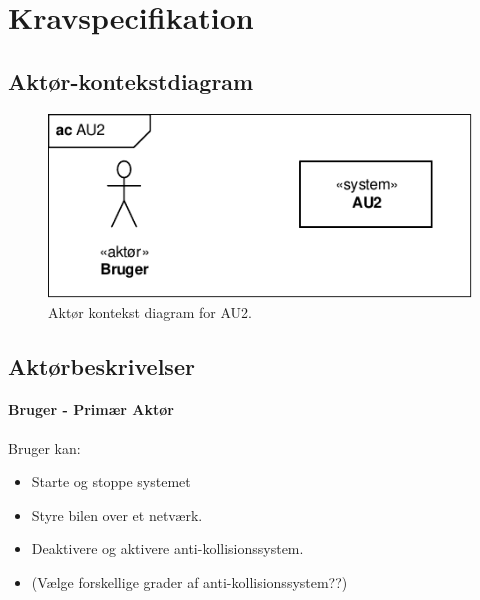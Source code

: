 \chapter{Kravspecifikation} \label{ch:kravspecifikation}


\section{Aktør-kontekstdiagram} \label{sec:aktor-kontekstdiagram}

\begin{figure}[h]
\centering
\includegraphics[width=\textwidth - 3 cm]{../fig/diagrammer/ac_au2.pdf}
\caption{Aktør kontekst diagram for AU2.}
\label{fig:aktor_kontekst}
\end{figure}


\section{Aktørbeskrivelser} \label{sec:aktorbeskrivelser}
\subsubsection{Bruger - Primær Aktør}
Bruger kan:
\begin{itemize}
\item Starte og stoppe systemet 
\item Styre bilen over et netværk.
\item Deaktivere og aktivere anti-kollisionssystem.
\item (Vælge forskellige grader af anti-kollisionssystem??)
\end{itemize}
\clearpage

